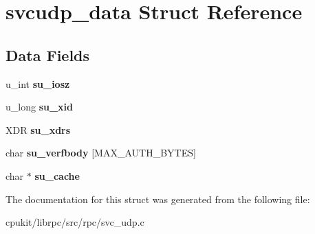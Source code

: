 \hypertarget{structsvcudp__data}{}\section{svcudp\+\_\+data Struct Reference}
\label{structsvcudp__data}
\subsection*{Data Fields}
\begin{DoxyCompactItemize}
\item 
\mbox{\label{structsvcudp__data_a44d9c7c9dbee998ec82d5dfbb02855da}} 
u\+\_\+int {\bfseries su\+\_\+iosz}
\item 
\mbox{\label{structsvcudp__data_a4f054c1649ae3f887eb3b59d8f2d3568}} 
u\+\_\+long {\bfseries su\+\_\+xid}
\item 
\mbox{\label{structsvcudp__data_aa3b448b4537c57b626b1c04142091226}} 
X\+DR {\bfseries su\+\_\+xdrs}
\item 
\mbox{\label{structsvcudp__data_aac4bc72477e546a620a0470a2ce4c0dd}} 
char {\bfseries su\+\_\+verfbody} \mbox{[}M\+A\+X\+\_\+\+A\+U\+T\+H\+\_\+\+B\+Y\+T\+ES\mbox{]}
\item 
\mbox{\label{structsvcudp__data_af911b40d43c540dd33b2271d3f030669}} 
char $\ast$ {\bfseries su\+\_\+cache}
\end{DoxyCompactItemize}


The documentation for this struct was generated from the following file\+:\begin{DoxyCompactItemize}
\item 
cpukit/librpc/src/rpc/svc\+\_\+udp.\+c\end{DoxyCompactItemize}
